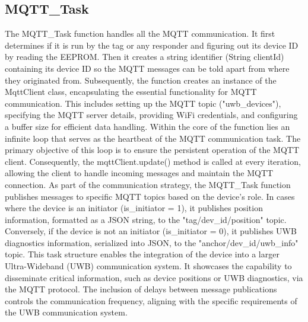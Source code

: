 \subsection{MQTT\_Task}
\label{sub:MQTT_Task}
The MQTT\_Task function handles all the MQTT communication. 
It first determines if it is run by the tag or any responder and figuring out its device ID by reading the EEPROM. 
Then it creates a string identifier (String clientId) containing its device ID so the MQTT messages can be told apart from where they originated from. 
\vspace{4pt}
\newline
Subsequently, the function creates an instance of the MqttClient class, encapsulating the essential functionality for MQTT communication. 
This includes setting up the MQTT topic ("uwb\_devices"), specifying the MQTT server details, providing WiFi credentials, and configuring a buffer size for efficient data handling.
\vspace{4pt}
\newline
Within the core of the function lies an infinite loop that serves as the heartbeat of the MQTT communication task. 
The primary objective of this loop is to ensure the persistent operation of the MQTT client. 
Consequently, the mqttClient.update() method is called at every iteration, allowing the client to handle incoming messages and maintain the MQTT connection.
\vspace{4pt}
\newline
As part of the communication strategy, the MQTT\_Task function publishes messages to specific MQTT topics based on the device's role. 
In cases where the device is an initiator (is\_initiator = 1), it publishes position information, formatted as a JSON string, to the "tag/{dev\_id}/position" topic. 
Conversely, if the device is not an initiator (is\_initiator = 0), it publishes UWB diagnostics information, serialized into JSON, to the "anchor/{dev\_id}/uwb\_info" topic.
\vspace{4pt}
\newline
This task structure enables the integration of the device into a larger Ultra-Wideband (UWB) communication system. 
It showcases the capability to disseminate critical information, such as device positions or UWB diagnostics, via the MQTT protocol. 
The inclusion of delays between message publications controls the communication frequency, aligning with the specific requirements of the UWB communication system. 


